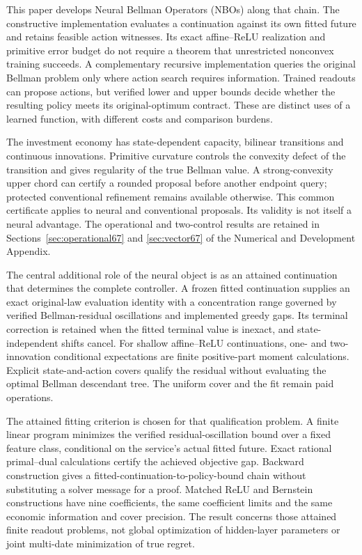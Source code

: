 \documentclass[ecta,nameyear,draft]{econsocart}
\begin{document}
This paper develops Neural Bellman Operators (NBOs) along that chain. The constructive implementation evaluates a continuation against its own fitted future and retains feasible action witnesses. Its exact affine--ReLU realization and primitive error budget do not require a theorem that unrestricted nonconvex training succeeds. A complementary recursive implementation queries the original Bellman problem only where action search requires information. Trained readouts can propose actions, but verified lower and upper bounds decide whether the resulting policy meets its original-optimum contract. These are distinct uses of a learned function, with different costs and comparison burdens.

The investment economy has state-dependent capacity, bilinear transitions and continuous innovations. Primitive curvature controls the convexity defect of the transition and gives regularity of the true Bellman value. A strong-convexity upper chord can certify a rounded proposal before another endpoint query; protected conventional refinement remains available otherwise. This common certificate applies to neural and conventional proposals. Its validity is not itself a neural advantage. The operational and two-control results are retained in Sections~\ref{sec:operational67} and \ref{sec:vector67} of the Numerical and Development Appendix.

The central additional role of the neural object is as an attained continuation that determines the complete controller. A frozen fitted continuation supplies an exact original-law evaluation identity with a concentration range governed by verified Bellman-residual oscillations and implemented greedy gaps. Its terminal correction is retained when the fitted terminal value is inexact, and state-independent shifts cancel. For shallow affine--ReLU continuations, one- and two-innovation conditional expectations are finite positive-part moment calculations. Explicit state-and-action covers qualify the residual without evaluating the optimal Bellman descendant tree. The uniform cover and the fit remain paid operations.

The attained fitting criterion is chosen for that qualification problem. A finite linear program minimizes the verified residual-oscillation bound over a fixed feature class, conditional on the service's actual fitted future. Exact rational primal--dual calculations certify the achieved objective gap. Backward construction gives a fitted-continuation-to-policy-bound chain without substituting a solver message for a proof. Matched ReLU and Bernstein constructions have nine coefficients, the same coefficient limits and the same economic information and cover precision. The result concerns those attained finite readout problems, not global optimization of hidden-layer parameters or joint multi-date minimization of true regret.
\end{document}
